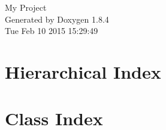 \documentclass[twoside]{book}
\newcommand{\clearemptydoublepage}{%
  \newpage{\pagestyle{empty}\cleardoublepage}%
}
\begin{document}
\hypersetup{pageanchor=false}
\begin{titlepage}
\vspace*{7cm}
\begin{center}%
{\Large My Project }\\
\vspace*{1cm}
{\large Generated by Doxygen 1.8.4}\\
\vspace*{0.5cm}
{\small Tue Feb 10 2015 15:29:49}\\
\end{center}
\end{titlepage}
\clearemptydoublepage
\tableofcontents
\clearemptydoublepage
{}
\hypersetup{pageanchor=true}

\chapter{Hierarchical Index}

\chapter{Class Index}

\end{document}
